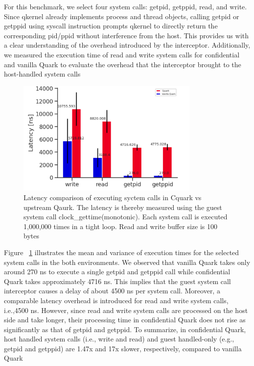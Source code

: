 For this benchmark, we select four system calls: getpid, getppid, read, and write. Since qkernel already implements process and thread objects, calling getpid or getppid using syscall instruction prompts qkernel to directly return the corresponding pid/ppid without interference from the host. 
This provides us with a clear understanding of the overhead introduced by the interceptor. Additionally, we measured the execution time of read and write system calls for confidential and vanilla Quark to evaluate the overhead that the interceptor brought to the host-handled system calls
\begin{figure}[H]
    \centering
    \includegraphics[width=0.8\textwidth]{images/ben_results_syscall_interceptor.PNG}
    \caption[Benchmark result of Syscall Interceptor]{Latency comparison of executing syctem calls in Cquark vs upstream Qaurk. The latency is thereby measured using the guest system call clock\_gettime(monotonic). 
        Each system call is executed 1,000,000 times in a tight loop. Read and write buffer size is 100 bytes}
    \label{fig:ben_results_syscall_interceptor}
\end{figure}


Figure ~\ref{fig:ben_results_syscall_interceptor} illustrates the mean and variance of execution times for the selected system calls in the both environments. We observed that vanilla Quark takes only around 270 ns to execute a single getpid and getppid call while confidential Quark
takes approximately 4716 ns. This implies that the guest system call interceptor causes a delay of about 4500 ns per system call. Moreover, a comparable latency overhead is introduced for read and write system calls, i.e.,4500 ns.  However, since read and write system calls are processed on 
the host side and take longer, their processing time in confidential Quark does not rise as significantly as that of getpid and getppid. To summarize, in confidential Quark, host handled system calls  (i.e., write and read) and guest handled-only (e.g., getpid and getppid) are 1.47x and 
17x slower, respectively, compared to vanilla Quark


